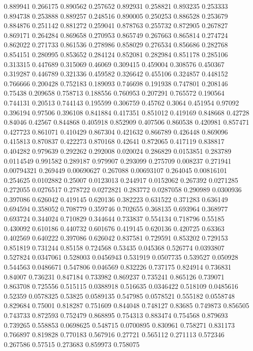 0.889941 0.266175
0.890562 0.257652
0.892931 0.258821
0.893235 0.253333
0.894738 0.253888
0.889257 0.248516
0.890005 0.250253
0.886528 0.253679
0.884876 0.251142
0.881272 0.259041
0.878763 0.255732
0.872905 0.267827
0.869171 0.264284
0.869658 0.270953
0.865749 0.267663
0.865814 0.274724
0.862022 0.271733
0.861536 0.278986
0.858029 0.276534
0.856686 0.282768
0.854151 0.280995
0.853652 0.284124
0.852081 0.282984
0.851178 0.285106
0.313315 0.447689
0.315069 0.46069
0.309415 0.459004
0.308576 0.450367
0.319287 0.446789
0.321336 0.459582
0.326642 0.455106
0.324857 0.448152
0.766666 0.200428
0.752183 0.189093
0.746698 0.191938
0.747801 0.208146
0.75438 0.209658
0.758713 0.188556
0.760953 0.207291
0.765572 0.190564
0.744131 0.20513
0.744143 0.195599
0.306759 0.45762
0.3064 0.451954
0.97092 0.396194
0.97506 0.396108
0.841884 0.417351
0.851012 0.419169
0.848668 0.42728
0.84046 0.42567
0.844868 0.405918
0.852909 0.407506
0.860538 0.420981
0.857471 0.427723
0.861071 0.410429
0.867304 0.421632
0.866789 0.426448
0.869096 0.415813
0.870837 0.422273
0.870168 0.42641
0.872065 0.417119
0.838817 0.404282
0.979639 0.292262
0.292008 0.020024
0.286829 0.0153851
0.283789 0.0114549
0.991582 0.289187
0.979907 0.293099
0.275709 0.008237
0.271941 0.00794321
0.269449 0.00690627
0.267088 0.00693107
0.264045 0.00816101
0.254625 0.0102882
0.25007 0.0123013
0.244917 0.0152062
0.267392 0.0271285
0.272055 0.0276517
0.278722 0.0272821
0.283772 0.0287058
0.290989 0.0300936
0.397086 0.626042
0.419145 0.620136
0.382223 0.631522
0.371283 0.636149
0.694594 0.358052
0.708779 0.359746
0.702655 0.368135
0.693964 0.368977
0.693724 0.344024
0.710829 0.344644
0.733837 0.554134
0.718796 0.55185
0.430092 0.610186
0.440732 0.601676
0.419145 0.620136
0.420725 0.63363
0.402569 0.640222
0.397086 0.626042
0.837581 0.729591
0.853202 0.729153
0.851819 0.731244
0.85158 0.724568
0.53435 0.045368
0.526774 0.0393807
0.527824 0.0347061
0.528003 0.0456943
0.531919 0.0507735
0.539527 0.050928
0.544563 0.0486671
0.547806 0.046569
0.832226 0.737175
0.824914 0.736831
0.84007 0.736231
0.847184 0.733982
0.869237 0.735241
0.865126 0.739071
0.863708 0.725556
0.515115 0.0388918
0.516635 0.0346422
0.518109 0.0485616
0.52359 0.0578325
0.53825 0.0589135
0.547985 0.0578521
0.555182 0.0558748
0.829684 0.75001
0.818287 0.751609
0.844048 0.748127
0.83685 0.749873
0.856505 0.743733
0.872593 0.752479
0.868895 0.754313
0.883474 0.754568
0.879693 0.739265
0.558853 0.0698625
0.548715 0.0700895
0.830961 0.758271
0.831173 0.766897
0.819828 0.770183
0.567916 0.27721
0.565112 0.271113
0.572346 0.267586
0.57515 0.273683
0.859973 0.758075
